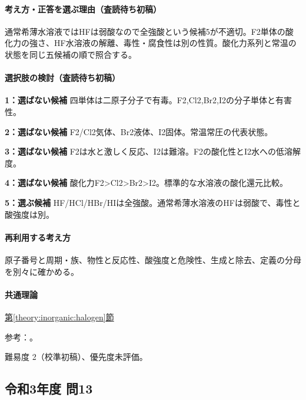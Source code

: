 \paragraph{考え方・正答を選ぶ理由（査読待ち初稿）} 通常希薄水溶液ではHFは弱酸なので全強酸という候補5が不適切。F2単体の酸化力の強さ、HF水溶液の解離、毒性・腐食性は別の性質。酸化力系列と常温の状態を同じ五候補の順で照合する。

\paragraph{選択肢の検討（査読待ち初稿）}\mbox{}\par

\noindent\textbf{1：選ばない候補} 四単体は二原子分子で有毒。F2,Cl2,Br2,I2の分子単体と有害性。\par

\noindent\textbf{2：選ばない候補} F2/Cl2気体、Br2液体、I2固体。常温常圧の代表状態。\par

\noindent\textbf{3：選ばない候補} F2は水と激しく反応、I2は難溶。F2の酸化性とI2水への低溶解度。\par

\noindent\textbf{4：選ばない候補} 酸化力F2>Cl2>Br2>I2。標準的な水溶液の酸化還元比較。\par

\noindent\textbf{5：選ぶ候補} HF/HCl/HBr/HIは全強酸。通常希薄水溶液のHFは弱酸で、毒性と酸強度は別。\par

\paragraph{再利用する考え方} 原子番号と周期・族、物性と反応性、酸強度と危険性、生成と除去、定義の分母を別々に確かめる。

\paragraph{共通理論} \hyperref[theory:inorganic:halogen]{第\ref*{theory:inorganic:halogen}節}

\par 参考：\cite{inorganic_halogen_ref,niosh_hf}。

\par 難易度 2（校準初稿）、優先度未評価。

\subsection{令和3年度 問13}
\label{q:r03-reg-applied-13}

